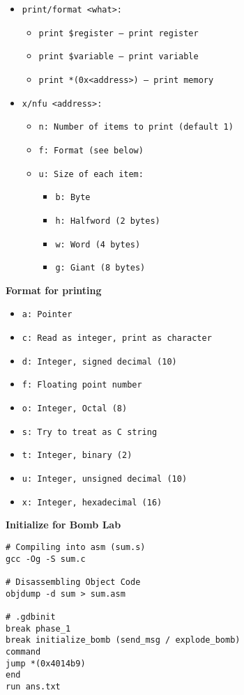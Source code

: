 \begin{itemize}[noitemsep, topsep=1pt]
    \item \tt{print/format <what>}:
        \begin{itemize}[noitemsep, topsep=1pt]
            \item \tt{print \$register} -- print register
            \item \tt{print \$variable} -- print variable
            \item \tt{print *(0x<address>)} -- print memory
        \end{itemize}
    \item \tt{x/nfu <address>}:
        \begin{itemize}[noitemsep, topsep=1pt]
            \item \tt{n}: Number of items to print (default 1)
            \item \tt{f}: Format (see below)
            \item \tt{u}: Size of each item:
                \begin{itemize}[noitemsep, topsep=1pt]
                    \item \tt{b}: Byte
                    \item \tt{h}: Halfword (2 bytes)
                    \item \tt{w}: Word (4 bytes)
                    \item \tt{g}: Giant (8 bytes)
                \end{itemize}
        \end{itemize}
\end{itemize}
\textbf{Format for printing}
\begin{itemize}[noitemsep, topsep=1pt]
    \item \tt{a}: Pointer
    \item \tt{c}: Read as integer, print as character
    \item \tt{d}: Integer, signed decimal (10)
    \item \tt{f}: Floating point number
    \item \tt{o}: Integer, Octal (8)
    \item \tt{s}: Try to treat as C string
    \item \tt{t}: Integer, binary (2)
    \item \tt{u}: Integer, unsigned decimal (10)
    \item \tt{x}: Integer, hexadecimal (16)
\end{itemize}
\vspace{5pt}
\textbf{Initialize for Bomb Lab}
\begin{verbatim}
# Compiling into asm (sum.s)
gcc -Og -S sum.c

# Disassembling Object Code
objdump -d sum > sum.asm

# .gdbinit
break phase_1
break initialize_bomb (send_msg / explode_bomb)
command
jump *(0x4014b9)
end
run ans.txt 
\end{verbatim}
